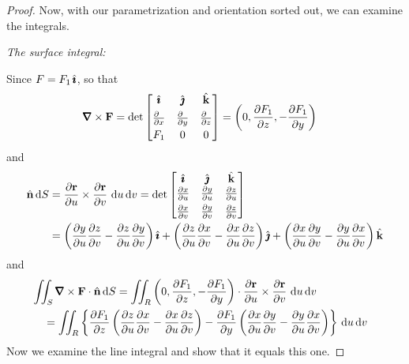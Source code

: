 \begin{proof}
Now, with our parametrization and orientation sorted out, we can examine
the integrals.

\bigskip
\noindent
\emph{The surface integral:}\ \ \

Since $F=F_1\,\hat{\pmb{\imath}}$, so that 
\begin{align*}
\vnabla\times\vF
&=\det\left[\begin{matrix} \hi & \hj & \hk \\[0.05in]
         \frac{\partial\hfill}{\partial x} & \frac{\partial\hfill}{\partial y} &
                         \frac{\partial\hfill}{\partial z} \\[0.05in]
         F_1 & 0 & 0
       \end{matrix}\right] 
= \left(0,\frac{\partial F_1}{\partial z}, 
                -\frac{\partial F_1}{\partial y}\right)
\end{align*}
and 
\begin{align*}
\hat{\mathbf{n}}\,\mathrm{d}S
&=\frac{\partial \mathbf{r}}{\partial u} \times \frac{\partial \mathbf{r}}{\partial v}
         \ \mathrm{d}u\,\mathrm{d}v 
=\det\left[\begin{matrix} \hat{\pmb{\imath}} & \hat{\pmb{\jmath}} & \hat{\mathbf{k}} \\
         \frac{\partial x}{\partial u} & \frac{\partial y}{\partial u} &
                         \frac{\partial z}{\partial u} \\[0.05in]
         \frac{\partial x}{\partial v} & \frac{\partial y}{\partial v} &
                         \frac{\partial z}{\partial v}
       \end{matrix}\right] \\
&=\left(\frac{\partial y}{\partial u}
                         \frac{\partial z}{\partial v}
                       -\frac{\partial z}{\partial u}
                       \frac{\partial y}{\partial v}\right)\hat{\pmb{\imath}}
  + \left(\frac{\partial z}{\partial u}
                         \frac{\partial x}{\partial v}
                       -\frac{\partial x}{\partial u}
                       \frac{\partial z}{\partial v}\right)\hat{\pmb{\jmath}}
  +\left(\frac{\partial x}{\partial u}
                         \frac{\partial y}{\partial v}
                       -\frac{\partial y}{\partial u}
                       \frac{\partial x}{\partial v}\right) \hat{\mathbf{k}}
\end{align*}
and
\begin{align*}
&\dblInt_{S}\vnabla\times\vF\cdot\hn\,\dee{S}
=\dblInt_{R}\left(0,\frac{\partial F_1}{\partial z}, 
                -\frac{\partial F_1}{\partial y}\right)
   \cdot\frac{\partial \vr}{\partial u}
\times \frac{\partial \vr}{\partial v}\ \dee{u}\,\dee{v}\cr
&\hskip.15in=\dblInt_{R}\left\{\frac{\partial F_1}{\partial z}
                    \left(\frac{\partial z}{\partial u}
                         \frac{\partial x}{\partial v}
                       -\frac{\partial x}{\partial u}
                       \frac{\partial z}{\partial v}\right)
-\frac{\partial F_1}{\partial y}
                    \left(\frac{\partial x}{\partial u}
                         \frac{\partial y}{\partial v}
                       -\frac{\partial y}{\partial u}
                       \frac{\partial x}{\partial v}\right)
\right\}\,\dee{u}\,\dee{v}
\end{align*}
Now we examine the line integral and show that it equals this one.


\end{proof}
